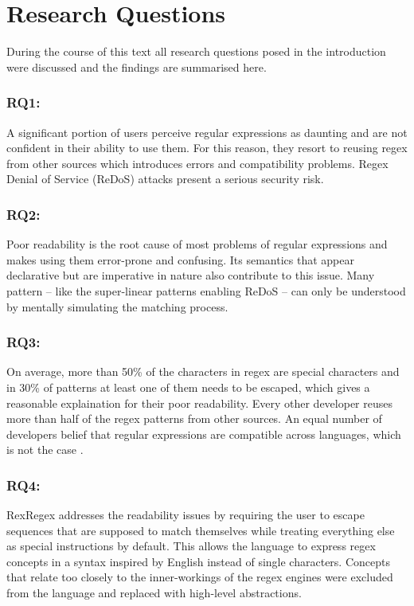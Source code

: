 \section{Research Questions}

During the course of this text all research questions posed in the introduction were discussed and the findings are summarised here.

\subsubsection{RQ1: \RQone}

A significant portion of users perceive regular expressions as daunting and are not confident in their ability to use them. For this reason, they resort to reusing regex from other sources which introduces errors and compatibility problems. Regex Denial of Service (ReDoS) attacks present a serious security risk.

\subsubsection{RQ2: \RQtwo}

Poor readability is the root cause of most problems of regular expressions and makes using them error-prone and confusing. Its semantics that appear declarative but are imperative in nature also contribute to this issue. Many pattern -- like the super-linear patterns enabling ReDoS -- can only be understood by mentally simulating the matching process. 

\subsubsection{RQ3: \RQthree}

On average, more than 50\% of the characters in regex are special characters and in 30\% of patterns at least one of them needs to be escaped, which gives a reasonable explaination for their poor readability. Every other developer reuses more than half of the regex patterns from other sources. An equal number of developers belief that regular expressions are compatible across languages, which is not the case \cite{RegexNotLinguaFranca}.

\subsubsection{RQ4: \RQfour}

RexRegex addresses the readability issues by requiring the user to escape sequences that are supposed to match themselves while treating everything else as special instructions by default. This allows the language to express regex concepts in a syntax inspired by English instead of single characters. Concepts that relate too closely to the inner-workings of the regex engines were excluded from the language and replaced with high-level abstractions.

